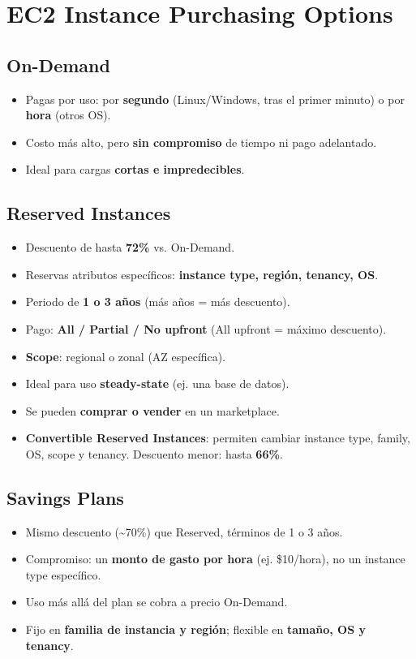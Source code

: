 \documentclass[11pt,a4paper]{article}
\let\oldsection\section
\renewcommand{\section}{\Needspace{9\baselineskip}\oldsection}
\let\oldsubsection\subsection
\renewcommand{\subsection}{\Needspace{6\baselineskip}\oldsubsection}
\begin{document}
\section{EC2 Instance Purchasing Options}

\subsection{On-Demand}
\begin{itemize}
  \item Pagas por uso: por \textbf{segundo} (Linux/Windows, tras el primer minuto) o por \textbf{hora} (otros OS).
  \item Costo más alto, pero \textbf{sin compromiso} de tiempo ni pago adelantado.
  \item Ideal para cargas \textbf{cortas e impredecibles}.
\end{itemize}

\subsection{Reserved Instances}
\begin{itemize}
  \item Descuento de hasta \textbf{72\%} vs. On-Demand.
  \item Reservas atributos específicos: \textbf{instance type, región, tenancy, OS}.
  \item Periodo de \textbf{1 o 3 años} (más años = más descuento).
  \item Pago: \textbf{All / Partial / No upfront} (All upfront = máximo descuento).
  \item \textbf{Scope}: regional o zonal (AZ específica).
  \item Ideal para uso \textbf{steady-state} (ej. una base de datos).
  \item Se pueden \textbf{comprar o vender} en un marketplace.
  \item \textbf{Convertible Reserved Instances}: permiten cambiar instance type, family, OS, scope y tenancy. Descuento menor: hasta \textbf{66\%}.
\end{itemize}

\subsection{Savings Plans}
\begin{itemize}
  \item Mismo descuento (\textasciitilde70\%) que Reserved, términos de 1 o 3 años.
  \item Compromiso: un \textbf{monto de gasto por hora} (ej. \$10/hora), no un instance type específico.
  \item Uso más allá del plan se cobra a precio On-Demand.
  \item Fijo en \textbf{familia de instancia y región}; flexible en \textbf{tamaño, OS y tenancy}.
\end{itemize}
\end{document}

